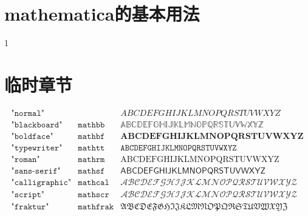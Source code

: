 \chapter{mathematica的基本用法}
1
\chapter{临时章节}
\begin{equation}
	\begin{array}{ll|l}
		\texttt{"normal"}      &\texttt{}         & ABCDEFGHIJKLMNOPQRSTUVWXYZ\\
		\texttt{"blackboard"}  &\texttt{mathbb}  &\mathbb{ABCDEFGHIJKLMNOPQRSTUVWXYZ}\\
		\texttt{"boldface"}    &\texttt{mathbf}  &\mathbf{ABCDEFGHIJKLMNOPQRSTUVWXYZ}\\
		\texttt{"typewriter"}  &\texttt{mathtt}  &\mathtt{ABCDEFGHIJKLMNOPQRSTUVWXYZ}\\
		\texttt{"roman"}       &\texttt{mathrm}  &\mathrm{ABCDEFGHIJKLMNOPQRSTUVWXYZ}\\
		\texttt{"sans-serif"}  &\texttt{mathsf}  &\mathsf{ABCDEFGHIJKLMNOPQRSTUVWXYZ}\\
		\texttt{"calligraphic"}&\texttt{mathcal} &\mathcal{ABCDEFGHIJKLMNOPQRSTUVWXYZ}\\
		\texttt{"script"}      &\texttt{mathscr} &\mathscr{ABCDEFGHIJKLMNOPQRSTUVWXYZ}\\
		\texttt{"fraktur"}     &\texttt{mathfrak}&\mathfrak{ABCDEFGHIJKLMNOPQRSTUVWXYZ}\\
	\end{array}
\end{equation}
